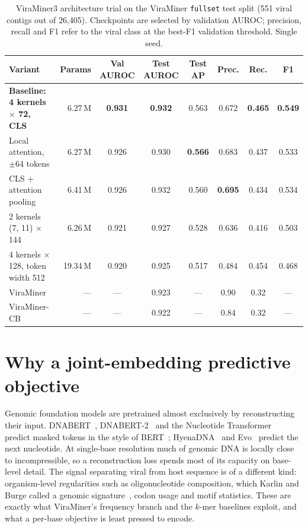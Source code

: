 \documentclass[10pt,twocolumn,a4paper]{article}
\begin{document}
\begin{table}[t]
\centering
\caption{ViraMiner3 architecture trial on the ViraMiner \texttt{fullset} test
split (551 viral contigs out of 26{,}405). Checkpoints are selected by validation
AUROC; precision, recall and F1 refer to the viral class at the best-F1
validation threshold. Single seed.}
\label{tab:vm3}
\footnotesize
\begin{tabular}{lrcccccc}
\toprule
Variant & Params & Val AUROC & Test AUROC & Test AP & Prec. & Rec. & F1 \\
\midrule
\textbf{Baseline: 4 kernels $\times$ 72, CLS} & 6.27\,M & \textbf{0.931} & \textbf{0.932} & 0.563 & 0.672 & \textbf{0.465} & \textbf{0.549} \\
Local attention, $\pm64$ tokens            & 6.27\,M & 0.926 & 0.930 & \textbf{0.566} & 0.683 & 0.437 & 0.533 \\
CLS $+$ attention pooling                  & 6.41\,M & 0.926 & 0.932 & 0.560 & \textbf{0.695} & 0.434 & 0.534 \\
2 kernels (7, 11) $\times$ 144             & 6.26\,M & 0.921 & 0.927 & 0.528 & 0.636 & 0.416 & 0.503 \\
4 kernels $\times$ 128, token width 512    & 19.34\,M & 0.920 & 0.925 & 0.517 & 0.484 & 0.454 & 0.468 \\
\midrule
ViraMiner~\cite{tampuu2019viraminer}       & --- & --- & 0.923 & --- & 0.90 & 0.32 & --- \\
ViraMiner-CB~\cite{pivotto2024viraminercb} & --- & --- & 0.922 & --- & 0.84 & 0.32 & --- \\
\bottomrule
\end{tabular}
\end{table}

\section{Why a joint-embedding predictive objective}\label{sec:why}

Genomic foundation models are pretrained almost exclusively by reconstructing
their input. DNABERT~\cite{ji2021dnabert}, DNABERT-2~\cite{zhou2024dnabert2} and
the Nucleotide Transformer~\cite{dallatorre2025nt} predict masked tokens in the
style of BERT~\cite{devlin2019bert}; HyenaDNA~\cite{nguyen2023hyenadna} and
Evo~\cite{nguyen2024evo} predict the next nucleotide. At single-base resolution much of genomic DNA is locally close to
incompressible, so a reconstruction loss spends most of its capacity on
base-level detail. The signal separating viral from host sequence is of a
different kind: organism-level regularities such as oligonucleotide composition,
which Karlin and Burge called a genomic signature~\cite{karlin1995signature},
codon usage and motif statistics. These are exactly what ViraMiner's frequency
branch and the $k$-mer baselines exploit, and what a per-base objective is least
pressed to encode.
\end{document}
